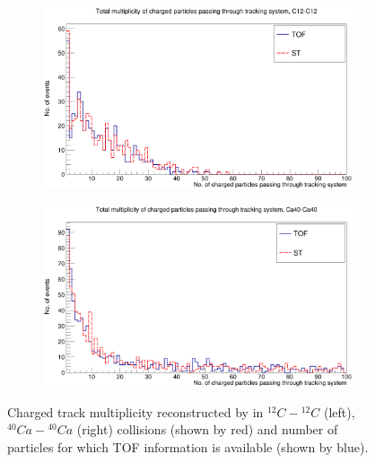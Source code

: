 \documentclass[12pt]{article}
\begin{document}
\begin{figure}[h]
\centering
\begin{subfigure}[h]{0.49\textwidth}
\centering
\includegraphics[scale=0.14]{Detector_TotalMultiplicity_C12.png}
\end{subfigure}
\hfill
\begin{subfigure}[h]{0.49\textwidth}
\centering
\includegraphics[scale=0.14]{Detector_TotalMultiplicity_Ca40.png}
\end{subfigure}
\caption{Charged track multiplicity reconstructed by in $^{12}C-{^{12}C}$ (left), $^{40}Ca-{^{40}Ca}$ (right) collisions (shown by red) and number of particles  for which TOF information
		is available (shown by blue).}
\label{sim-multiplicity-C-C and Ca-Ca}
\end{figure}
\end{document}
